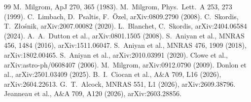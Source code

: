\documentclass[10pt]{article}
\begin{document}
\begin{thebibliography}{99}\small
{} M.~Milgrom, ApJ 270, 365 (1983).
 M.~Milgrom, Phys.\ Lett.\ A 253, 273 (1999).
 C.~Limbach, D.~Psaltis, F.~\"Ozel, arXiv:0809.2790 (2008).
 C.~Skordis, T.~Z\l{}o\'snik, arXiv:2007.00082 (2020).
 L.~Blanchet, C.~Skordis, arXiv:2404.06584 (2024).
 A.~A.~Dutton et al., arXiv:0801.1505 (2008).
 S.~Aniyan et al., MNRAS 456, 1484 (2016), arXiv:1511.06047.
 S.~Aniyan et al., MNRAS 476, 1909 (2018), arXiv:1802.00465.
 S.~Aniyan et al., arXiv:2010.03991 (2020).
 Clowe et al., arXiv:astro-ph/0608407 (2006).
 M.~Milgrom, arXiv:0912.0790 (2009).
 Donlon et al., arXiv:2501.03409 (2025).
 B.~I.~Ciocan et al., A\&A 709, L16 (2026), arXiv:2604.22613.
 G.~T.~Alcock, MNRAS 551, L1 (2026), arXiv:2609.38796.
 Jeanneau et al., A\&A 709, A120 (2026), arXiv:2603.28856.
\end{thebibliography}
\end{document}
